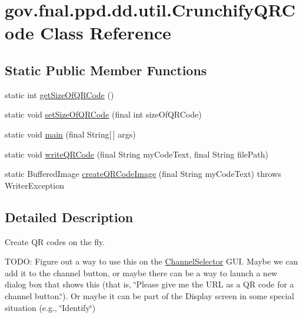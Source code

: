 \hypertarget{classgov_1_1fnal_1_1ppd_1_1dd_1_1util_1_1CrunchifyQRCode}{\section{gov.\-fnal.\-ppd.\-dd.\-util.\-Crunchify\-Q\-R\-Code Class Reference}
\label{classgov_1_1fnal_1_1ppd_1_1dd_1_1util_1_1CrunchifyQRCode}
}
\subsection*{Static Public Member Functions}
\begin{DoxyCompactItemize}
\item 
static int \hyperlink{classgov_1_1fnal_1_1ppd_1_1dd_1_1util_1_1CrunchifyQRCode_a6bf970fcb89f16adf68d1ea7e470eb15}{get\-Size\-Of\-Q\-R\-Code} ()
\item 
static void \hyperlink{classgov_1_1fnal_1_1ppd_1_1dd_1_1util_1_1CrunchifyQRCode_ae71b2f8f878b6cd6c9e090104d91a28f}{set\-Size\-Of\-Q\-R\-Code} (final int size\-Of\-Q\-R\-Code)
\item 
static void \hyperlink{classgov_1_1fnal_1_1ppd_1_1dd_1_1util_1_1CrunchifyQRCode_a46e2a30a4ce50a4c4424cd2d1d42ab6a}{main} (final String\mbox{[}$\,$\mbox{]} args)
\item 
static void \hyperlink{classgov_1_1fnal_1_1ppd_1_1dd_1_1util_1_1CrunchifyQRCode_af3ad34bec90ccd331cab5adf934be15e}{write\-Q\-R\-Code} (final String my\-Code\-Text, final String file\-Path)
\item 
static Buffered\-Image \hyperlink{classgov_1_1fnal_1_1ppd_1_1dd_1_1util_1_1CrunchifyQRCode_ae49122284c7beebe71a127f90a140b19}{create\-Q\-R\-Code\-Image} (final String my\-Code\-Text)  throws Writer\-Exception 
\end{DoxyCompactItemize}


\subsection{Detailed Description}
Create Q\-R codes on the fly.

T\-O\-D\-O\-: Figure out a way to use this on the \hyperlink{classgov_1_1fnal_1_1ppd_1_1dd_1_1ChannelSelector}{Channel\-Selector} G\-U\-I. Maybe we can add it to the channel button, or maybe there can be a way to launch a new dialog box that shows this (that is, \char`\"{}\-Please give me the U\-R\-L as a Q\-R code for a channel button.\char`\"{}). Or maybe it can be part of the Display screen in some special situation (e.\-g., \char`\"{}\-Identify\char`\"{})

